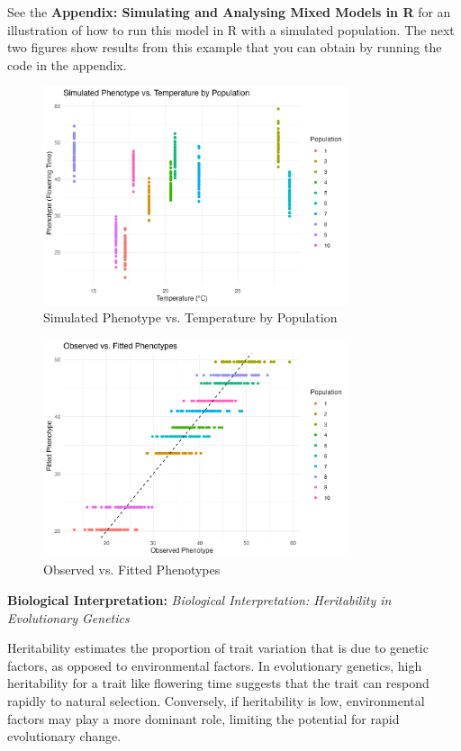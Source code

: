 \documentclass[12pt,a4paper]{article}
\newenvironment{interpretation}[1][]
{\begin{basebox}[linecolor=uqgreen]
\textbf{\color{uqgreen}Biological Interpretation:} \textit{#1}\par\noindent\ignorespaces}
{\end{basebox}}
\begin{document}
See the \textbf{Appendix: Simulating and Analysing Mixed Models in R} for an illustration of how to run this model in R with a simulated population. The next two figures show results from this example that you can obtain by running the code in the appendix. 

\begin{figure}[h]
\centering
\includegraphics[width=0.8\textwidth]{simulated_phenotype_vs_temperature.png}
\caption{Simulated Phenotype vs. Temperature by Population}
\end{figure}

\begin{figure}[h]
\centering
\includegraphics[width=0.8\textwidth]{observed_vs_fitted_phenotypes.png}
\caption{Observed vs. Fitted Phenotypes}
\end{figure}

\begin{interpretation}[Biological Interpretation: Heritability in Evolutionary Genetics]
Heritability estimates the proportion of trait variation that is due to genetic factors, as opposed to environmental factors. In evolutionary genetics, high heritability for a trait like flowering time suggests that the trait can respond rapidly to natural selection. Conversely, if heritability is low, environmental factors may play a more dominant role, limiting the potential for rapid evolutionary change.
\end{interpretation}
\end{document}
